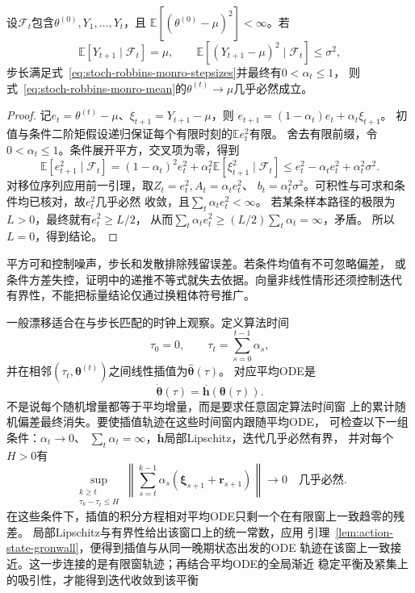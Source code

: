 \begin{theorem}[均值求根的几乎必然收敛]
  \label{thm:stoch-mean-root-convergence}
  设$\mathcal F_t$包含$\theta^{(0)},Y_1,\ldots,Y_t$，且
  $\mathbb E[(\theta^{(0)}-\mu)^2]<\infty$。若
  \[
    \mathbb E[Y_{t+1}\mid\mathcal F_t]=\mu,\qquad
    \mathbb E[(Y_{t+1}-\mu)^2\mid\mathcal F_t]\leq\sigma^2,
  \]
  步长满足式~\eqref{eq:stoch-robbins-monro-stepsizes}并最终有$0<\alpha_t\leq1$，
  则式~\eqref{eq:stoch-robbins-monro-mean}的$\theta^{(t)}\to\mu$几乎必然成立。
\end{theorem}
\begin{proof}
  记$e_t=\theta^{(t)}-\mu$、$\xi_{t+1}=Y_{t+1}-\mu$，则
  $e_{t+1}=(1-\alpha_t)e_t+\alpha_t\xi_{t+1}$。
  初值与条件二阶矩假设递归保证每个有限时刻的$\mathbb E e_t^2$有限。
  舍去有限前缀，令$0<\alpha_t\leq1$。条件展开平方，交叉项为零，得到
  \[
    \mathbb E[e_{t+1}^2\mid\mathcal F_t]
    =(1-\alpha_t)^2e_t^2
      +\alpha_t^2\mathbb E[\xi_{t+1}^2\mid\mathcal F_t]
    \leq e_t^2-\alpha_te_t^2+\alpha_t^2\sigma^2.
  \]
  对移位序列应用前一引理，取$Z_t=e_t^2,A_t=\alpha_te_t^2$、
  $b_t=\alpha_t^2\sigma^2$。可积性与可求和条件均已核对，故$e_t^2$几乎必然
  收敛，且$\sum_t\alpha_te_t^2<\infty$。
  若某条样本路径的极限为$L>0$，最终就有$e_t^2\geq L/2$，
  从而$\sum_t\alpha_te_t^2\geq(L/2)\sum_t\alpha_t=\infty$，矛盾。
  所以$L=0$，得到结论。
\end{proof}
平方可和控制噪声，步长和发散排除残留误差。若条件均值有不可忽略偏差，
或条件方差失控，证明中的递推不等式就失去依据。向量非线性情形还须控制迭代
有界性，不能把标量结论仅通过换粗体符号推广。

一般漂移适合在与步长匹配的时钟上观察。定义算法时间
\begin{equation}
  \tau_0=0,\qquad \tau_t=\sum_{s=0}^{t-1}\alpha_s,
  \label{eq:stoch-algorithmic-time}
\end{equation}
并在相邻$(\tau_t,\bm\theta^{(t)})$之间线性插值为$\widehat{\bm\theta}(\tau)$。
对应平均ODE是
\begin{equation}
  \dot{\bm\theta}(\tau)=\overline{\bm h}(\bm\theta(\tau)).
  \label{eq:stoch-mean-ode}
\end{equation}
不是说每个随机增量都等于平均增量，而是要求任意固定算法时间窗
上的累计随机偏差最终消失。要使插值轨迹在这些时间窗内跟随平均ODE，
可检查以下一组条件：$\alpha_t\to0$、
$\sum_t\alpha_t=\infty$，$\overline{\bm h}$局部Lipschitz，迭代几乎必然有界，
并对每个$H>0$有
\[
  \sup_{\substack{k\geq t\\\tau_k-\tau_t\leq H}}
  \left\|\sum_{s=t}^{k-1}\alpha_s(\bm\xi_{s+1}+\bm r_{s+1})\right\|
  \longrightarrow0\quad\text{几乎必然}.
\]
在这些条件下，插值的积分方程相对平均ODE只剩一个在有限窗上一致趋零的残差。
局部Lipschitz与有界性给出该窗口上的统一常数，应用
引理~\ref{lem:action-state-gronwall}，便得到插值与从同一晚期状态出发的ODE
轨迹在该窗上一致接近。这一步连接的是有限窗轨迹；再结合平均ODE的全局渐近
稳定平衡及紧集上的吸引性，才能得到迭代收敛到该平衡

